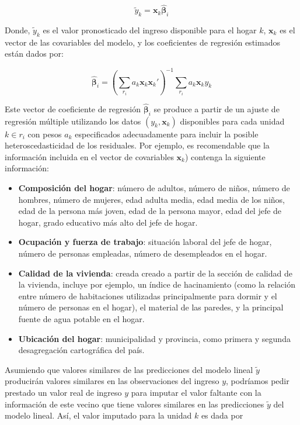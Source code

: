 \documentclass[
  12pt,
]{book}
\providecommand{\tightlist}{%
  \setlength{\itemsep}{0pt}\setlength{\parskip}{0pt}}
\begin{document}
\[\tilde{y}_k = \mathbf{x}_k \hat{\boldsymbol{\beta}}_i\]

Donde, \(\tilde{y}_k\) es el valor pronosticado del ingreso disponible para el hogar \(k\), \(\mathbf{x}_k\) es el vector de las covariables del modelo, y los coeficientes de regresión estimados están dados por:

\[
\hat{\boldsymbol{\beta}}_i = \left(\sum_{r_i} a_k\mathbf{x}_k\mathbf{x}_k'\right)^{-1}
\sum_{r_i} a_k\mathbf{x}_ky_k
\]

Este vector de coeficiente de regresión \(\hat{\boldsymbol{\beta}}_i\) se produce a partir de un ajuste de regresión múltiple utilizando los datos \((y_k, \mathbf{x}_k)\) disponibles para cada unidad \(k \in r_i\) con pesos \(a_k\) especificados adecuadamente para incluir la posible heteroscedasticidad de los residuales. Por ejemplo, es recomendable que la información incluida en el vector de covariables \(\mathbf{x}_k\)) contenga la siguiente información:

\begin{itemize}
\tightlist
\item
  \textbf{Composición del hogar}: número de adultos, número de niños, número de hombres, número de mujeres, edad adulta media, edad media de los niños, edad de la persona más joven, edad de la persona mayor, edad del jefe de hogar, grado educativo más alto del jefe de hogar.
\item
  \textbf{Ocupación y fuerza de trabajo}: situación laboral del jefe de hogar, número de personas empleadas, número de desempleados en el hogar.
\item
  \textbf{Calidad de la vivienda}: creada creado a partir de la sección de calidad de la vivienda, incluye por ejemplo, un índice de hacinamiento (como la relación entre número de habitaciones utilizadas principalmente para dormir y el número de personas en el hogar), el material de las paredes, y la principal fuente de agua potable en el hogar.
\item
  \textbf{Ubicación del hogar}: municipalidad y provincia, como primera y segunda desagregación cartográfica del país.
\end{itemize}

Asumiendo que valores similares de las predicciones del modelo lineal \(\tilde y\) producirán valores similares en las observaciones del ingreso \(y\), podríamos pedir prestado un valor real de ingreso \(y\) para imputar el valor faltante con la información de este vecino que tiene valores similares en las predicciones \(\tilde y\) del modelo lineal. Así, el valor imputado para la unidad \(k\) es dada por
\end{document}
